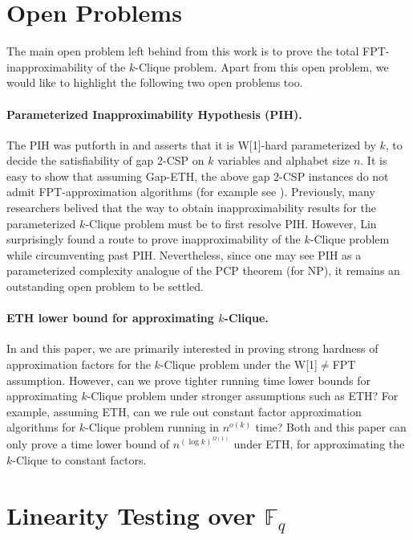 \documentclass[11pt]{article}
\newcommand{\F}{\mathbb{F}}
\begin{document}
\section{Open Problems}\label{sec:open}

The main open problem left behind from this work is to prove the total FPT-inapproximability of the $k$-Clique problem. Apart from this open problem, we would like to highlight the following two open problems too. 

\paragraph{Parameterized Inapproximability Hypothesis (PIH).} The PIH was putforth in \cite{LRSZ20} and asserts that it is W[1]-hard parameterized by $k$, to decide the satisfiability of gap 2-CSP on $k$ variables and alphabet size $n$. It is easy to show that assuming  Gap-ETH, the above gap 2-CSP instances do not admit FPT-approximation algorithms  (for example see \cite{BGKM18}). Previously, many researchers belived that the way to obtain  inapproximability results for the parameterized $k$-Clique problem must be to first resolve PIH. However, Lin \cite{L21} surprisingly found a route  to prove  inapproximability of the $k$-Clique problem while circumventing past PIH.   Nevertheless, since one may see PIH as a parameterized complexity analogue of the PCP theorem (for NP), it remains an outstanding open problem to be settled.  

\paragraph{ETH lower bound for approximating $k$-Clique.}
In \cite{L21} and this paper, we are primarily interested in proving strong hardness of approximation factors for the $k$-Clique problem under the W[1]$\neq$FPT assumption.  However, can we prove tighter running time lower bounds for approximating $k$-Clique problem under stronger assumptions such as ETH? For example, assuming ETH, can we rule out constant factor approximation algorithms for $k$-Clique problem running in $n^{o(k)}$ time? 
Both \cite{L21} and this paper can only prove a time lower bound of $n^{(\log k)^{\Omega(1)}}$ under ETH, for  approximating the $k$-Clique to constant factors. 


 
 
 \appendix
 
 \section{Linearity Testing over $\F_q$}\label{sec:appendix}
\end{document}
